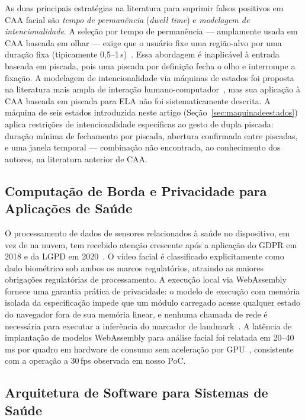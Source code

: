 As duas principais estratégias na literatura para suprimir falsos positivos em CAA
facial são \emph{tempo de permanência} (\emph{dwell time}) e \emph{modelagem de
intencionalidade}. A seleção por tempo de permanência — amplamente usada em CAA
baseada em olhar — exige que o usuário fixe uma região-alvo por uma duração fixa
(tipicamente 0,5--1\,s)~\cite{majaranta2002eyetyping}. Essa abordagem é inaplicável
à entrada baseada em piscada, pois uma piscada por definição fecha o olho e interrompe
a fixação. A modelagem de intencionalidade via máquinas de estados foi proposta na
literatura mais ampla de interação humano-computador~\cite{zander2011passive}, mas sua
aplicação à CAA baseada em piscada para ELA não foi sistematicamente descrita. A
máquina de seis estados introduzida neste artigo (Seção~\ref{sec:maquinadeestados})
aplica restrições de intencionalidade específicas ao gesto de dupla piscada: duração
mínima de fechamento por piscada, abertura confirmada entre piscadas, e uma janela
temporal — combinação não encontrada, ao conhecimento dos autores, na literatura
anterior de CAA.

\subsection{Computação de Borda e Privacidade para Aplicações de Saúde}

O processamento de dados de sensores relacionados à saúde no dispositivo, em vez de
na nuvem, tem recebido atenção crescente após a aplicação do GDPR em 2018 e da LGPD
em 2020~\cite{edpb2020privacy}. O vídeo facial é classificado explicitamente como dado
biométrico sob ambos os marcos regulatórios, atraindo as maiores obrigações regulatórias
de processamento. A execução local via WebAssembly fornece uma garantia prática de
privacidade: o modelo de execução com memória isolada da especificação impede que um
módulo carregado acesse qualquer estado do navegador fora de sua memória linear, e
nenhuma chamada de rede é necessária para executar a inferência do marcador de
landmark~\cite{haas2017wasm}. A latência de implantação de modelos WebAssembly para
análise facial foi relatada em 20--40\,ms por quadro em hardware de consumo sem
aceleração por GPU~\cite{lugaresi2019mediapipe}, consistente com a operação a 30\,fps
observada em nosso PoC.

\subsection{Arquitetura de Software para Sistemas de Saúde}

